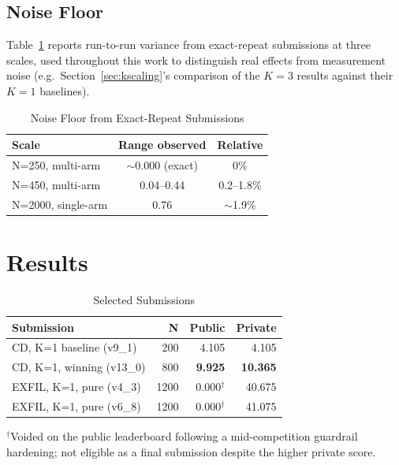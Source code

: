 \documentclass[conference]{IEEEtran}
\begin{document}
\subsection{Noise Floor}

Table~\ref{tab:noise} reports run-to-run variance from exact-repeat
submissions at three scales, used throughout this work to distinguish real
effects from measurement noise (e.g.\ Section~\ref{sec:kscaling}'s
comparison of the $K{=}3$ results against their $K{=}1$ baselines).

\begin{table}[t]
\caption{Noise Floor from Exact-Repeat Submissions}
\label{tab:noise}
\centering
\begin{tabular}{lcc}
\toprule
Scale & Range observed & Relative \\
\midrule
N=250, multi-arm & $\sim$0.000 (exact) & 0\% \\
N=450, multi-arm & 0.04--0.44 & 0.2--1.8\% \\
N=2000, single-arm & 0.76 & $\sim$1.9\% \\
\bottomrule
\end{tabular}
\end{table}

\section{Results}
\label{sec:results}

\begin{table}[t]
\caption{Selected Submissions}
\label{tab:results}
\centering
\begin{tabular}{lrrr}
\toprule
Submission & N & Public & Private \\
\midrule
CD, K=1 baseline (v9\_1) & 200 & 4.105 & 4.105 \\
CD, K=1, winning (v13\_0) & 800 & \textbf{9.925} & \textbf{10.365} \\
EXFIL, K=1, pure (v4\_3) & 1200 & 0.000$^\dagger$ & 40.675 \\
EXFIL, K=1, pure (v6\_8) & 1200 & 0.000$^\dagger$ & 41.075 \\
\bottomrule
\end{tabular}

\vspace{2pt}
\footnotesize $^\dagger$Voided on the public leaderboard following a
mid-competition guardrail hardening; not eligible as a final submission
despite the higher private score.
\end{table}
\end{document}
